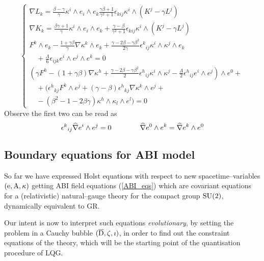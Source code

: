 \begin{equation}\label{ABI_eqs}
    \begin{cases}
    \nabla L_k=\frac{\beta-\gamma}{\gamma}\kappa^i\wedge e_i\wedge e_k\frac{\gamma\beta+1}{\gamma^2+1}\epsilon_{kij}\kappa^i\wedge(K^j-\gamma L^j)\\
    \nabla K_k=\frac{\beta\gamma+1}{\gamma}\kappa^i\wedge e_i\wedge e_k+\frac{\gamma-\beta}{\gamma^2+1}\epsilon_{kij}\kappa^i\wedge(K^j-\gamma L^j)\\
    F^k\wedge e_k-\frac{1+\gamma\beta}{\gamma}\nabla\kappa^k\wedge e_k+\frac{\gamma-2\beta-\gamma\beta^2}{2\gamma}{\epsilon^k}_{ij}\kappa^i\wedge\kappa^j\wedge e_k\\
    \quad+\frac{\Lambda}{6}\epsilon_{ijk}e^i\wedge e^j \wedge e^k=0\\
    \left(\gamma F^h-(1+\gamma\beta)\nabla\kappa^h+\frac{\gamma-2\beta-\gamma\beta^2}{2}{\epsilon^h}_{ij}\kappa^i\wedge\kappa^j-\frac{\Lambda}{2}{\epsilon^h}_{ij}e^i\wedge e^j\right)\wedge e^0+\\
    \quad+\bigg({\epsilon^h}_{kj}F^k\wedge e^j+(\gamma-\beta){\epsilon^h}_{kj}\nabla\kappa^k\wedge e^j+\\
    \quad-(\beta^2-1-2\beta\gamma)\kappa^h\wedge\kappa_l\wedge e^l\bigg)=0
\end{cases}
\end{equation}
Observe the first two can be read as
$${\epsilon^k}_{ij}\widehat{\nabla} e^i\wedge e^j=0\qquad\qquad\widehat{\nabla} e^0\wedge e^k=\widehat{\nabla} e^k\wedge e^0$$

\subsection{Boundary equations for ABI model}

So far we have expressed Holst equations with respect to new spacetime--variables $(\text{\normalfont e},\text{\normalfont A},\kappa)$ getting ABI field equations (\ref{ABI_eqs}) which are covariant equations for a (relativistic) natural--gauge theory for the compact group $\text{\normalfont SU}(2)$, dynamically equivalent to GR. 

Our intent is now to interpret such equations \emph{evolutionary}, by setting the problem in a Cauchy bubble $(\overline{\text{\normalfont D}},\zeta,\imath)$, %
in order to find out the constraint equations of the theory, which will be the starting point of the quantisation procedure of LQG.

